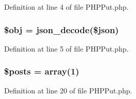 Definition at line 4 of file P\-H\-P\-Put.\-php.

\hypertarget{_p_h_p_put_8php_a9008ed94ba185855b1723e367744b87e}{
\subsubsection[{\$obj}]{\setlength{\rightskip}{0pt plus 5cm}\$obj = json\-\_\-decode(\$json)}}\label{_p_h_p_put_8php_a9008ed94ba185855b1723e367744b87e}


Definition at line 5 of file P\-H\-P\-Put.\-php.

\hypertarget{_p_h_p_put_8php_a9f4cad5a721e7f7711fba0bf0f7ec273}{
\subsubsection[{\$posts}]{\setlength{\rightskip}{0pt plus 5cm}\$posts = array(1)}}\label{_p_h_p_put_8php_a9f4cad5a721e7f7711fba0bf0f7ec273}


Definition at line 20 of file P\-H\-P\-Put.\-php.

